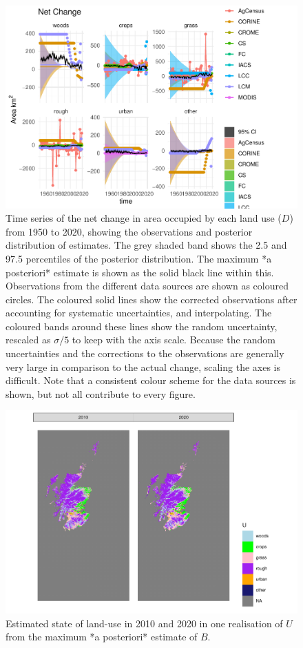 \documentclass[
]{book}
\begin{document}
\begin{figure}
\includegraphics[width=1.3\linewidth]{Results_sc_files/figure-latex/plotD-1} \caption{ Time series of the net change in area occupied by each land use ($D$) from 1950 to 2020, showing the observations and posterior distribution of estimates. The grey shaded band shows the 2.5 and 97.5 percentiles of the posterior distribution. The maximum *a posteriori* estimate is shown as the solid black line within this. Observations from the different data sources are shown as coloured circles. The coloured solid lines show the corrected observations after accounting for systematic uncertainties, and interpolating. The coloured bands around these lines show the random uncertainty, rescaled as $\sigma /5$ to keep with the axis scale. Because the random uncertainties and the corrections to the observations are generally very large in comparison to the actual change, scaling the axes is difficult. Note that a consistent colour scheme for the data sources is shown, but not all contribute to every figure.}\label{fig:plotD}
\end{figure}

\begin{figure}
\includegraphics[width=1.3\linewidth]{Results_sc_files/figure-latex/plotUt-1} \caption{Estimated state of land-use in 2010 and 2020 in one realisation of $U$ from the maximum *a posteriori* estimate of $B$.}\label{fig:plotUt}
\end{figure}
\end{document}
